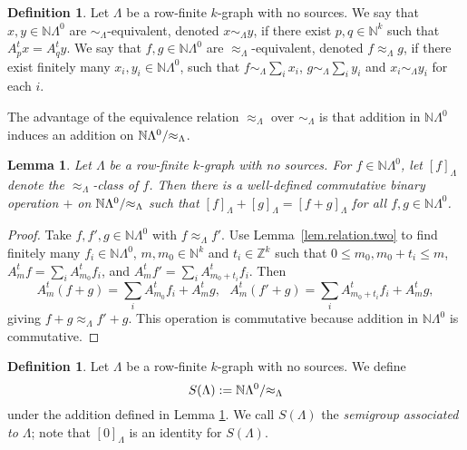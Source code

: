 \documentclass[a4paper, 12pt]{amsart}
\numberwithin{equation}{section}
\newcounter{theorem}
\newtheorem{lemma}[theorem]{Lemma}
\theoremstyle{remark}
\theoremstyle{definition}
\newtheorem{defn}[theorem]{Definition}
\begin{document}
\begin{defn}\label{def.relation}
Let $\Lambda$ be a row-finite $k$-graph with no sources. We say that $x,y\in {\mathbb{N}} \Lambda^0$
are $\sim_{\Lambda}$-equivalent, denoted $x\sim_{\Lambda}y$, if there exist $p,q\in
{\mathbb{N}}^k$ such that $A^t_px=A^t_qy$. We say that $f,g\in {\mathbb{N}} \Lambda^0$ are
$\approx_{\Lambda}$-equivalent, denoted $f\approx_{\Lambda}g$, if there exist finitely
many $x_i,y_i\in {\mathbb{N}} \Lambda^0$, such that $f\sim_{\Lambda}\sum_i x_i$,
$g\sim_{\Lambda}\sum_i y_i$ and $x_i\sim_{\Lambda} y_i$ for each $i$.
\end{defn}

The advantage of the equivalence relation $\approx_{\Lambda}$ over $\sim_{\Lambda}$ is
that addition in  ${\mathbb{N}} \Lambda^0$ induces an addition on ${\mathbb{N}}
\Lambda^0/{\negthickspace}\approx_{\Lambda}$.

\begin{lemma}\label{lem.addition}
Let $\Lambda$ be a row-finite $k$-graph with no sources. For $f\in {\mathbb{N}} \Lambda^0$, let
$[f]_\Lambda$ denote the $\approx_{\Lambda}$-class of $f$. Then there is a well-defined
commutative binary operation $+$ on ${\mathbb{N}} \Lambda^0/{\negthickspace}\approx_{\Lambda}$ such
that ${{[{f}]_\Lambda}}+{{[{g}]_\Lambda}}={{[{f+g}]_\Lambda}}$ for all $f,g\in {\mathbb{N}} \Lambda^0$.
\end{lemma}
\begin{proof}
Take $f,f',g\in {\mathbb{N}} \Lambda^0$ with $f\approx_{\Lambda}f'$. Use Lemma~\ref{lem.relation.two} to find finitely many $f_i\in
{\mathbb{N}} \Lambda^0$, $m,m_0\in {\mathbb{N}}^k$ and $t_i\in {\mathbb{Z}}^k$ such that $0\leq m_0,m_0+t_i\leq m$,
$A^t_mf=\sum_iA^t_{m_0}f_i$, and $A^t_mf'=\sum_i A^t_{m_0+t_i}f_i$. Then
$$A^t_m(f+g)=\sum_iA^t_{m_0}f_i+A^t_mg, \ \ \ A^t_m(f'+g)=\sum_i A^t_{m_0+t_i}f_i+A^t_mg,$$
giving $f+g\approx_{\Lambda}f'+g$. This operation is commutative because addition in ${\mathbb{N}}
\Lambda^0$ is commutative.
\end{proof}

\begin{defn}\label{def.S.Lambda}
Let $\Lambda$ be a row-finite $k$-graph with no sources. We define $$S(\Lambda):={\mathbb{N}}
\Lambda^0/{\negthickspace}\approx_{\Lambda}$$ under the addition defined in Lemma
\ref{lem.addition}. We call $S(\Lambda)$ the \emph{semigroup associated to $\Lambda$}; note that ${{[{0}]_\Lambda}}$ is an identity for $S(\Lambda)$.
\end{defn}
\end{document}
